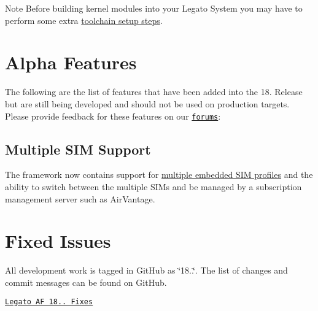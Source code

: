 \begin{DoxyNote}{Note}
Before building kernel modules into your Legato System you may have to perform some extra \hyperlink{basicBuildToolchain_basicBuildLegato_ToolchainSWI_KO}{toolchain setup steps}.
\end{DoxyNote}
\hypertarget{releaseNotes18060_rn1806_AFeatures}{}\section{Alpha Features}\label{releaseNotes18060_rn1806_AFeatures}
The following are the list of features that have been added into the 18. Release but are still being developed and should not be used on production targets. Please provide feedback for these features on our \href{https://forum.legato.io/}{\tt forums}\+:\hypertarget{releaseNotes18060_rn1806_Features_SIM}{}\subsection{Multiple S\+I\+M Support}\label{releaseNotes18060_rn1806_Features_SIM}
The framework now contains support for \hyperlink{c_sim_le_sim_profile_switch}{multiple embedded S\+IM profiles} and the ability to switch between the multiple S\+I\+Ms and be managed by a subscription management server such as Air\+Vantage.\hypertarget{releaseNotes18060_rn1806_Fixes}{}\section{Fixed Issues}\label{releaseNotes18060_rn1806_Fixes}
All development work is tagged in Git\+Hub as \char`\"{}18..\char`\"{}. The list of changes and commit messages can be found on Git\+Hub.


\begin{DoxyItemize}
\item \href{https://github.com/legatoproject/legato-af/commits/18.06.0}{\tt Legato AF 18.. Fixes}
\end{DoxyItemize}


